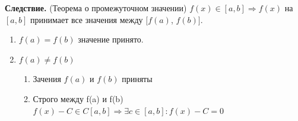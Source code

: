 \documentclass[12pt, a4paper]{article}
\begin{document}
\textbf{Следствие.} (Теорема о промежуточном значении) $f(x) \in [a, b] \Rightarrow f(x)$ на $[a, b]$ принимает все значения между $[f(a)$, $f(b)]$. 
\begin{tcolorbox}[title=Доказательство]
	\begin{enumerate}
		\item $f(a) = f(b)$ значение принято. 
		\item $f(a) \not= f(b)$
			\begin{enumerate}
				\item Зачения $f(a)$ и $f(b)$ приняты
				\item Строго между f(a) и f(b) \\
					$f(x) - C \in C[a, b] \Rightarrow \exists c \in [a,b]: f(x) - C = 0$
			\end{enumerate}
	\end{enumerate}
\end{tcolorbox}
\end{document}
